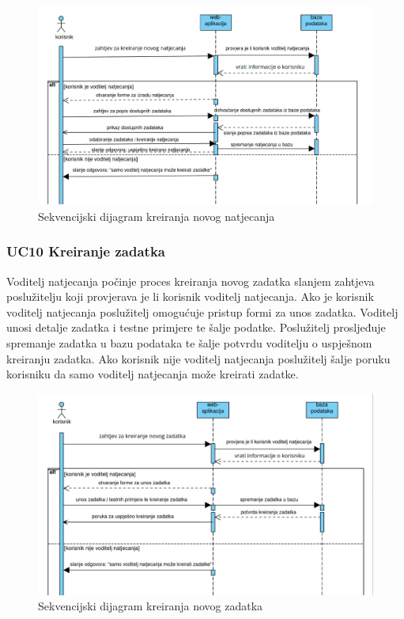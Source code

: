 				\begin{figure}[htbp]
					\centering
					\includegraphics[width=\linewidth]{slike/kreiranje_natjecanja.png}
					\caption{Sekvencijski dijagram kreiranja novog natjecanja}\label{fig:seqdiag_natjecanja}
				\end{figure}
				
				\clearpage 

				\subsubsection*{UC10 Kreiranje zadatka}
				
				Voditelj natjecanja počinje proces kreiranja novog zadatka slanjem zahtjeva poslužitelju koji provjerava je li korisnik voditelj natjecanja. Ako je korisnik voditelj natjecanja poslužitelj omogućuje pristup formi za unos zadatka. Voditelj unosi detalje zadatka i testne primjere te šalje podatke. Poslužitelj prosljeđuje spremanje zadatka u bazu podataka te šalje potvrdu voditelju o uspješnom kreiranju zadatka. Ako korisnik nije voditelj natjecanja poslužitelj šalje poruku korisniku da samo voditelj natjecanja može kreirati zadatke.
				\vspace{20mm}

				\begin{figure}[htbp]
					\centering
					\includegraphics[width=\linewidth]{slike/kreiranje_zadatka.png}
					\caption{Sekvencijski dijagram kreiranja novog zadatka}\label{fig:seqdiag_zadatka}
				\end{figure}
				
